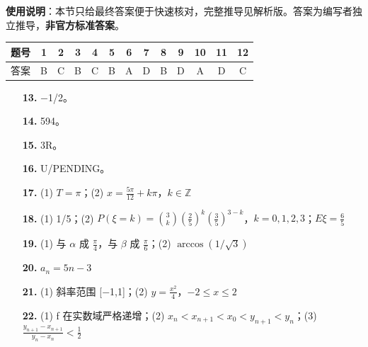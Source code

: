 
\begin{gknotice}
\textbf{使用说明}：本节只给最终答案便于快速核对，完整推导见解析版。答案为编写者独立推导，\textbf{非官方标准答案}。
\end{gknotice}

\begin{center}\begin{tabular}{ccccccccccccc}
\toprule
题号 & 1 & 2 & 3 & 4 & 5 & 6 & 7 & 8 & 9 & 10 & 11 & 12 \\
\midrule
答案 & B & C & B & C & B & A & D & B & D & A & D & C \\
\bottomrule
\end{tabular}\end{center}

\begin{itemize}[leftmargin=2.6em]
  \item[\textbf{13.}] $-$1/2。
  \item[\textbf{14.}] 594。
  \item[\textbf{15.}] 3R。
  \item[\textbf{16.}] U/PENDING。
\end{itemize}

\begin{itemize}[leftmargin=2.6em]
  \item[\textbf{17.}] (1) $T=\pi$；(2) $x=\frac{5\pi}{12}+k\pi$，$k\in\mathbb{Z}$
  \item[\textbf{18.}] (1) 1/5；(2) $P(\xi=k)=\binom{3}{k}(\frac25)^k(\frac35)^{3-k}$，$k=0,1,2,3$；$E\xi=\frac65$
  \item[\textbf{19.}] (1) 与 $\alpha$ 成 $\frac\pi4$，与 $\beta$ 成 $\frac\pi6$；(2) $\arccos(1/\sqrt3)$
  \item[\textbf{20.}] $a_n=5n-3$
  \item[\textbf{21.}] (1) 斜率范围 [$-$1,1]；(2) $y=\frac{x^2}{4}$，$-2\le x\le2$
  \item[\textbf{22.}] (1) f 在实数域严格递增；(2) $x_n<x_{n+1}<x_0<y_{n+1}<y_n$；(3) $\frac{y_{n+1}-x_{n+1}}{y_n-x_n}<\frac12$
\end{itemize}
